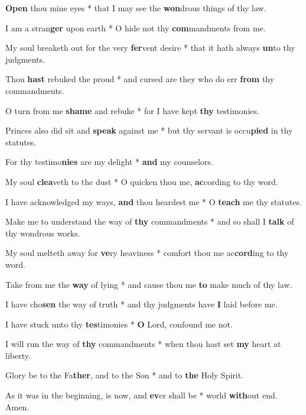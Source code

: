 \begin{multicols}{2}
	\textbf{Open} thou mine eyes * that I may see the \textbf{won}drous things of thy law.
	
	I am a stran\textbf{ger} upon earth * O hide not thy \textbf{com}mandments from me.
	
	My soul breaketh out for the very \textbf{fer}vent desire * that it hath always \textbf{un}to thy judgments.
	
	Thou \textbf{hast} rebuked the proud * and cursed are they who do err \textbf{from} thy commandments.
	
	O turn from me \textbf{shame} and rebuke * for I have kept \textbf{thy} testimonies.
	
	Princes also did sit and \textbf{speak} against me * but thy servant is occu\textbf{pied} in thy statutes.
	
	For thy testimo\textbf{nies} are my delight * \textbf{and} my counselors.
	
	My soul \textbf{clea}veth to the dust * O quicken thou me, \textbf{ac}cording to thy word.
	
	I have acknowledged my ways, \textbf{and} thou heardest me * O \textbf{teach} me thy statutes.
	
	Make me to understand the way of \textbf{thy} commandments * and so shall I \textbf{talk} of thy wondrous works.
	
	My soul melteth away for \textbf{ve}ry heaviness * comfort thou me ac\textbf{cord}ing to thy word.
	
	Take from me the \textbf{way} of lying * and cause thou me \textbf{to} make much of thy law.
	
	I have cho\textbf{sen} the way of truth * and thy judgments have \textbf{I} laid before me.
	
	I have stuck unto thy \textbf{tes}timonies * \textbf{O} Lord, confound me not.
	
	I will run the way of \textbf{thy} commandments * when thou hast set \textbf{my} heart at liberty.
	
	Glory be to the Fa\textbf{ther}, and to the Son * and to \textbf{the} Holy Spirit.
	
	As it was in the beginning, is now, and \textbf{ev}er shall be * world \textbf{with}out end. Amen.
\end{multicols}